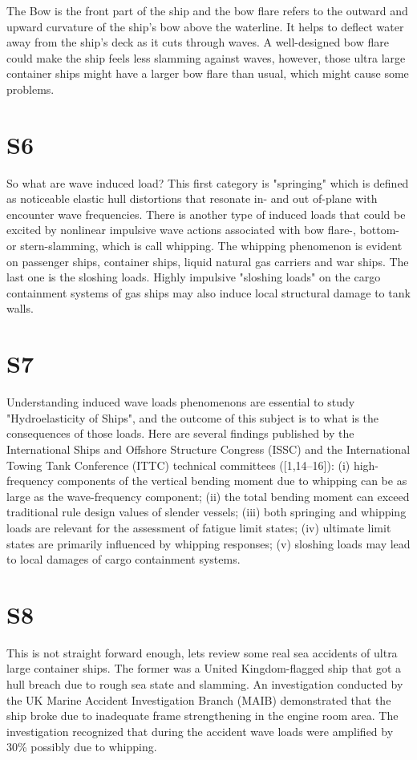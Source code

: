 \documentclass[17pt]{extarticle} %
\begin{document}
The Bow is the front part of the ship and the bow flare refers to the outward and upward curvature of the ship's bow above the waterline. It helps to deflect water 
away from the ship’s 
deck as it cuts through waves. A well-designed bow flare could make the ship feels less slamming against waves, however, those ultra large container ships might 
have a larger bow flare than usual, which 
might cause some problems.

\section*{S6}
So what are wave induced load? This first category is "springing" which is defined as 
noticeable elastic hull distortions that resonate in- and out of-plane with encounter wave frequencies. There is another type of induced loads that could be excited 
by nonlinear impulsive wave actions
associated with bow flare-, bottom- or stern-slamming, which is call whipping. The whipping phenomenon is evident on passenger ships, 
container ships, liquid natural gas carriers and war ships. The last one is the sloshing loads. Highly impulsive "sloshing loads" on the cargo containment systems of gas 
ships may also induce local structural damage to tank walls. 

\section*{S7}
Understanding induced wave loads phenomenons are essential to study "Hydroelasticity of Ships", and the outcome of this subject is to what is the consequences of 
those loads. Here are several findings 
published by  the International Ships and Offshore Structure Congress (ISSC) and the International Towing Tank Conference (ITTC) 
technical committees ([1,14–16]): (i) high-frequency components of the vertical bending moment due to whipping 
can be as large as the wave-frequency component; (ii) the total bending moment can exceed traditional rule design values of 
slender vessels; (iii) both springing and whipping loads are relevant for the assessment of fatigue limit states; (iv) ultimate 
limit states are primarily influenced by whipping responses; (v) sloshing loads may lead to local damages of cargo containment 
systems. 

\section*{S8}
This is not straight forward enough, lets review some real sea accidents of ultra large container ships. The former was a United Kingdom-flagged ship that got a 
hull breach due to rough sea state and slamming. An investigation conducted by the UK Marine Accident Investigation Branch (MAIB)
demonstrated that the ship broke due to inadequate frame strengthening in the engine room area. The investigation recognized that during the accident wave loads 
were amplified by 30\% possibly due to whipping.
\end{document}
